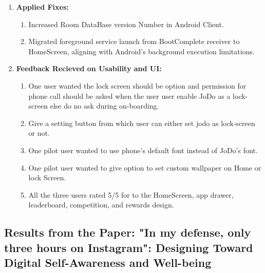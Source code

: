\documentclass[12pt]{article}
\begin{document}
\begin{enumerate}
\begin{enumerate}
        \item \textbf{ActivityThread.generateForegroundServiceDidNotStartInTimeException: } Sometimes background service did not started from launcher.  
    \end{enumerate}
    \item \textbf{Applied Fixes:} 
    \begin{enumerate}
    \item Increased Room DataBase version Number in Android Client.
    \item Migrated foreground service launch from BootComplete receiver to HomeScreen, aligning with Android's background execution limitations.
    \end{enumerate}
\item \textbf{Feedback Recieved on Usability and UI: }
\begin{enumerate}
    \item One user wanted the lock screen should be option and permission for phone call should be asked when the user user enable JoDo as a lock-screen else do no ask during on-boarding.
    \item Give a setting button from which user can either set jodo as lock-screen or not.
    \item One pilot user wanted to use phone's default font instead of JoDo's font.
    \item One pilot user wanted to give option to set custom wallpaper on Home or lock Screen.
    \item All the three users rated 5/5  for to the  HomeScreen, app drawer, leaderboard, competition, and rewards design.
\end{enumerate}
\end{enumerate}


\subsection{Results from the Paper: "In my defense, only three hours on Instagram": Designing
Toward Digital Self-Awareness and Well-being \cite{karthik2026}}
\end{document}
